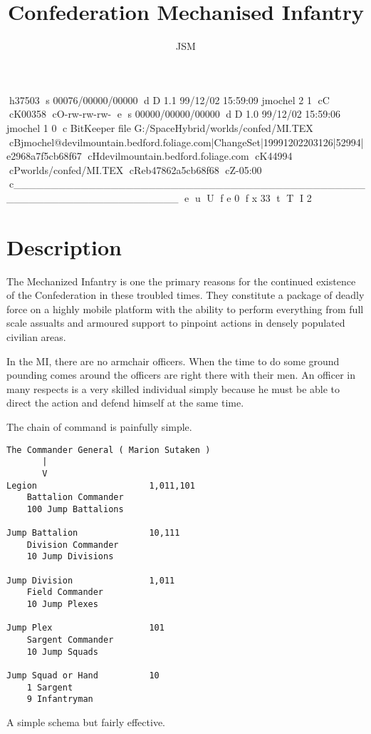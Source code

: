 h37503
s 00076/00000/00000
d D 1.1 99/12/02 15:59:09 jmochel 2 1
cC
cK00358
cO-rw-rw-rw-
e
s 00000/00000/00000
d D 1.0 99/12/02 15:59:06 jmochel 1 0
c BitKeeper file G:/SpaceHybrid/worlds/confed/MI.TEX
cBjmochel@devilmountain.bedford.foliage.com|ChangeSet|19991202203126|52994|e2968a7f5cb68f67
cHdevilmountain.bedford.foliage.com
cK44994
cPworlds/confed/MI.TEX
cReb47862a5cb68f68
cZ-05:00
c______________________________________________________________________
e
u
U
f e 0
f x 33
t
T
I 2

\title{Confederation Mechanised Infantry}
\author{JSM}
\maketitle
\section{Description}

The Mechanized Infantry is one the primary reasons for the continued 
existence of the Confederation in these troubled times. They 
constitute a package of deadly force on a highly mobile platform with 
the ability to perform everything from full scale assualts and 
armoured support to pinpoint actions in densely populated civilian 
areas.

In the MI, there are no armchair officers. When the time to do some
ground pounding comes around the officers are right there with their 
men. An officer in many respects is a very skilled individual simply 
because he must be able to direct the action and defend himself at 
the same time. 

The chain of command is painfully simple. 

\begin{verbatim}
The Commander General ( Marion Sutaken )
       |
	   V	
Legion						1,011,101	
	Battalion Commander
	100 Jump Battalions   

Jump Battalion				10,111
	Division Commander           
    10 Jump Divisions      

Jump Division               1,011 
	Field Commander
	10 Jump Plexes	      

Jump Plex					101
	Sargent Commander         
    10 Jump Squads		    

Jump Squad or Hand			10 
	1 Sargent                
    9 Infantryman       	 
\end{verbatim}

A simple schema but fairly effective. 

